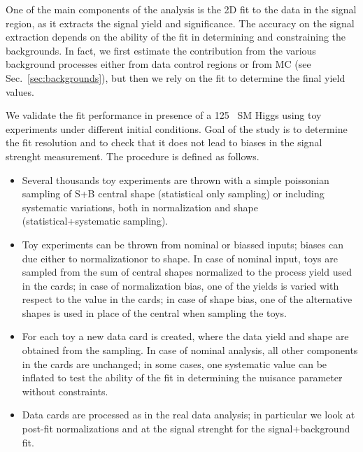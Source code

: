 One of the main components of the analysis is the 2D fit to the data in the signal region, 
as it extracts the signal yield and significance.
The accuracy on the signal extraction depends on the ability of the fit in determining 
and constraining the backgrounds.
In fact, we first estimate the contribution from the various background processes 
either from data control regions or from MC (see Sec.~\ref{sec:backgrounds}), 
but then we rely on the fit to determine the final yield values. 

We validate the fit performance in presence of a 125 \GeV\ SM Higgs using toy experiments 
under different initial conditions.
Goal of the study is to determine the fit resolution and to check that it does not lead to 
biases in the signal strenght measurement. The procedure is defined as follows.

\begin{itemize}
\item Several thousands toy experiments are thrown with a simple poissonian sampling of S+B central shape (statistical only sampling)
or including systematic variations, both in normalization and shape (statistical+systematic sampling). 
\item Toy experiments can be thrown from nominal or biassed inputs; biases can due either to normalizationor to shape. 
In case of nominal input, toys are sampled from the sum of central shapes normalized to the process yield used in the cards;
in case of normalization bias, one of the yields is varied with respect to the value in the cards; 
in case of shape bias, one of the alternative shapes is used in place of the central when sampling the toys.
\item For each toy a new data card is created, where the data yield and shape are obtained from the sampling.
In case of nominal analysis, all other components in the cards are unchanged; 
in some cases, one systematic value can be inflated to test the ability of the fit in determining 
the nuisance parameter without constraints.
\item Data cards are processed as in the real data analysis; in particular we look at post-fit normalizations 
and at the signal strenght for the signal+background fit.
\end{itemize}

